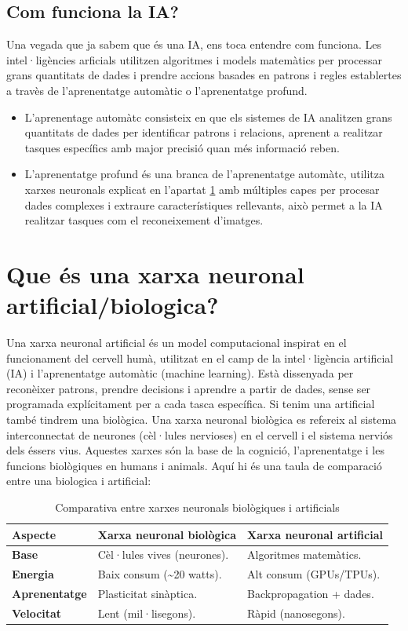 \subsection{Com funciona la IA?}
Una vegada que ja sabem que és una IA, ens toca entendre com funciona. Les intel·ligències arficials utilitzen algoritmes i models matemàtics per processar grans quantitats de dades i prendre accions basades en patrons i regles establertes a travès de l'aprenentatge automàtic o l'aprenentatge profund.
\begin{itemize}
 \item L'aprenentage automàtc consisteix en que els sistemes de IA analitzen grans quantitats de dades per identificar patrons i relacions, aprenent a realitzar tasques específics amb major precisió quan més informació reben.
 \item L'aprenentatge profund és una branca de l'aprenentatge automàtc, utilitza xarxes neuronals explicat en l'apartat \ref{sec:3.3} amb múltiples capes per procesar dades complexes i extraure característiques rellevants, això permet a la IA realitzar tasques com el reconeixement d'imatges.
\end{itemize}

\section{Que és una xarxa neuronal artificial/biologica?}\label{sec:3.3}
Una xarxa neuronal artificial és un model computacional inspirat en el funcionament del cervell humà, utilitzat en el camp de la intel·ligència artificial (IA) i l'aprenentatge automàtic (machine learning). Està dissenyada per reconèixer patrons, prendre decisions i aprendre a partir de dades, sense ser programada explícitament per a cada tasca específica.
Si tenim una artificial també tindrem una biològica. Una xarxa neuronal biològica es refereix al sistema interconnectat de neurones (cèl·lules nervioses) en el cervell i el sistema nerviós dels éssers vius. Aquestes xarxes són la base de la cognició, l'aprenentatge i les funcions biològiques en humans i animals.
Aquí hi és una taula de comparació entre una biologica i artificial:

\begin{table}[t!]
\begin{tabular}{|l|l|l|}
\hline
\textbf{Aspecte} & \textbf{Xarxa neuronal biològica} & \textbf{Xarxa neuronal artificial} \\ \hline
\textbf{Base} & Cèl·lules vives (neurones). & Algoritmes matemàtics. \\ \hline
\textbf{Energia} & Baix consum (\textasciitilde20 watts). & Alt consum (GPUs/TPUs). \\ \hline
\textbf{Aprenentatge} & Plasticitat sinàptica. & Backpropagation + dades. \\ \hline
\textbf{Velocitat} & Lent (mil·lisegons). & Ràpid (nanosegons). \\ \hline
\end{tabular}
\caption{Comparativa entre xarxes neuronals biològiques i artificials}
\end{table}

